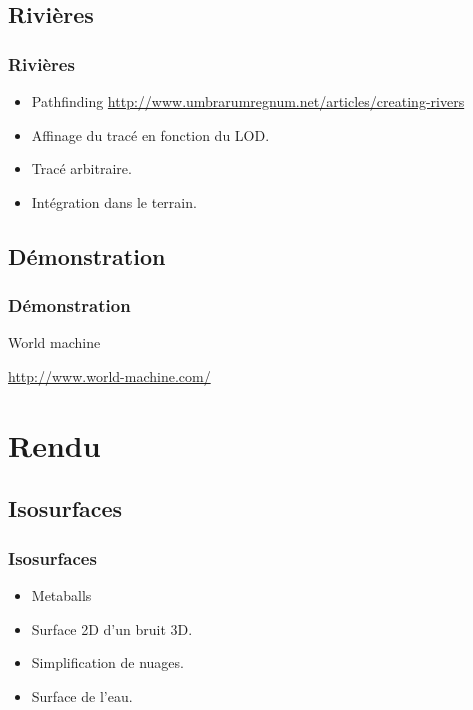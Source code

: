 \documentclass[hyperref={pdfpagelabels=false}]{beamer}
\begin{document}
\subsection{Rivières}

\begin{frame}
  \frametitle{Rivières}
  \begin{itemize}
  \item Pathfinding {\tiny\url{http://www.umbrarumregnum.net/articles/creating-rivers}}
  \item Affinage du tracé en fonction du LOD.
  \item Tracé arbitraire.
  \item Intégration dans le terrain.
  \end{itemize}
\end{frame}

\subsection{Démonstration}
\begin{frame}
  \frametitle{Démonstration}
  \begin{center}
  {\Huge World machine}
  
  \vspace{1em}
  \url{http://www.world-machine.com/}
  \end{center}
\end{frame}

\section{Rendu}

\subsection{Isosurfaces}
\begin{frame}
  \frametitle{Isosurfaces}
  \begin{itemize}
    \item Metaballs %
    \item Surface 2D d'un bruit 3D.
    \item Simplification de nuages.
    \item Surface de l'eau.
  \end{itemize}
\end{frame}
\end{document}
